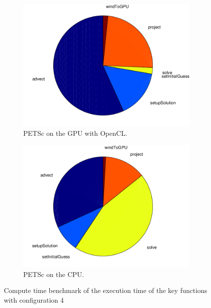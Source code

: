 \begin{figure}[ht]
	\center
	
	\begin{subfigure}{0.45\textwidth}
		\center
		\includegraphics[width=1.0\textwidth]{results/data/td/td_conf4_petsc_gpu}
		\caption{PETSc on the GPU with OpenCL.}
		\label{fig:td_conf4_petsc_gpu}
	\end{subfigure}
	\begin{subfigure}{0.45\textwidth}
		\center
		\includegraphics[width=1.0\textwidth]{results/data/td/td_conf4_petsc_cpu}
		\caption{PETSc on the CPU.}
		\label{fig:td_conf4_petsc_cpu}
	\end{subfigure}
	\caption{Compute time benchmark of the execution time of the key functions
			with configuration 4}
	\label{fig:td_conf4}
	
\end{figure}

